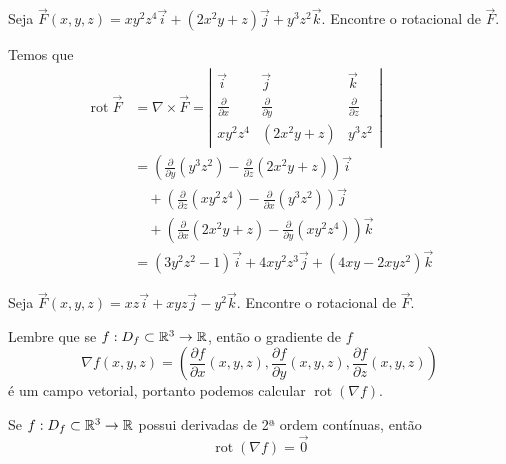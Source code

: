 \begin{example}
    Seja \(\overrightarrow{F}(x,y,z) = xy^2z^4 \overrightarrow{i} + (2x^2y + z)\overrightarrow{j} + y^3z^2 \overrightarrow{k}.\) Encontre o rotacional de \(\overrightarrow{F}\).

    Temos que
        \begin{align*}
            \operatorname{rot}\overrightarrow{F}
                & = \nabla \times \overrightarrow{F} = \left|\begin{matrix}
    \overrightarrow{i} & \overrightarrow{j} & \overrightarrow{k}  \\
    \frac{\partial}{\partial x} & \frac{\partial}{\partial y} & \frac{\partial}{\partial z} \\
    xy^2z^4 & (2x^2y + z) & y^3z^2
\end{matrix}\right|\\
                & = \left( \frac{\partial}{\partial y} (y^3 z^2) - \frac{\partial}{\partial z} (2x^2y + z) \right)\overrightarrow{i} \\
                & \quad + \left( \frac{\partial}{\partial z} (xy^2z^4) - \frac{\partial}{\partial x}(y^3 z^2) \right)\overrightarrow{j} \\
                & \quad + \left( \frac{\partial}{\partial x}(2x^2y+z) - \frac{\partial}{\partial y} (xy^2z^4) \right)\overrightarrow{k}\\
                & = (3y^2z^2 - 1)\overrightarrow{i} + 4xy^2z^3\overrightarrow{j} + (4xy - 2xyz^2)\overrightarrow{k}
        \end{align*}
\end{example}

\begin{exercise}
    Seja \(\overrightarrow{F}(x,y,z) = xz\overrightarrow{i} + xyz\overrightarrow{j} - y^2\overrightarrow{k}\). Encontre o rotacional de \(\overrightarrow{F}\).
\end{exercise}

Lembre que se \(f:D_f \subset \mathbb{R}^3 \to \mathbb{R}\), então o gradiente de \(f\) \[\nabla f(x,y,z) = \left( \frac{\partial f}{\partial x} (x,y,z), \frac{\partial f}{\partial y} (x,y,z), \frac{\partial f}{\partial z} (x,y,z) \right)\] é um campo vetorial, portanto podemos calcular \(\operatorname{rot}(\nabla f)\).

\begin{theorem}\label{thm.rot0}
    Se \(f:D_f \subset\mathbb{R}^3 \to \mathbb{R}\) possui derivadas de 2ª  ordem contínuas, então \[\operatorname{rot}(\nabla f) = \overrightarrow{0}\]
\end{theorem}


